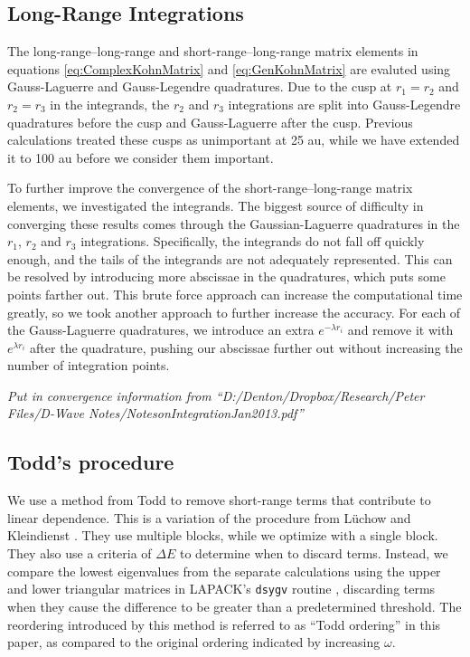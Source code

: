 \documentclass[preprint,showpacs,preprintnumbers,amsmath,amssymb]{revtex4}
\begin{document}
\subsection{Long-Range Integrations}
\label{sec:LongInt}
The long-range--long-range and short-range--long-range matrix elements in equations \ref{eq:ComplexKohnMatrix} and \ref{eq:GenKohnMatrix} are evaluted using Gauss-Laguerre and Gauss-Legendre quadratures. Due to the cusp at $r_1 = r_2$ and $r_2 = r_3$ in the integrands, the $r_2$ and $r_3$ integrations are split into Gauss-Legendre quadratures before the cusp and Gauss-Laguerre after the cusp.  Previous calculations \cite{VanReeth2003,VanReeth2004} treated these cusps as unimportant at 25 au, while we have extended it to 100 au before we consider them important.

To further improve the convergence of the short-range--long-range matrix elements, we investigated the integrands. The biggest source of difficulty in converging these results comes through the Gaussian-Laguerre quadratures in the $r_1$, $r_2$ and $r_3$ integrations. Specifically, the integrands do not fall off quickly enough, and the tails of the integrands are not adequately represented. This can be resolved by introducing more abscissae in the quadratures, which puts some points farther out. This brute force approach can increase the computational time greatly, so we took another approach to further increase the accuracy. For each of the Gauss-Laguerre quadratures, we introduce an extra $e^{-\lambda r_i}$ and remove it with $e^{\lambda r_i}$ after the quadrature, pushing our abscissae further out without increasing the number of integration points.

\emph{Put in convergence information from ``D:/Denton/Dropbox/Research/Peter Files/D-Wave Notes/NotesonIntegrationJan2013.pdf''}



\subsection{Todd's procedure}
\label{sec:Todd}
We use a method from Todd \cite{Todd2007} to remove short-range terms that contribute to linear dependence. This is a variation of the procedure from L\"uchow and Kleindienst \cite{Luchow1992}. They use multiple blocks, while we optimize with a single block. They also use a criteria of $\Delta E$ to determine when to discard terms. Instead, we compare the lowest eigenvalues from the separate calculations using the upper and lower triangular matrices in LAPACK's \texttt{dsygv} routine \cite{LAPACK}, discarding terms when they cause the difference to be greater than a predetermined threshold. The reordering introduced by this method is referred to as ``Todd ordering'' in this paper, as compared to the original ordering indicated by increasing $\omega$.
\end{document}
